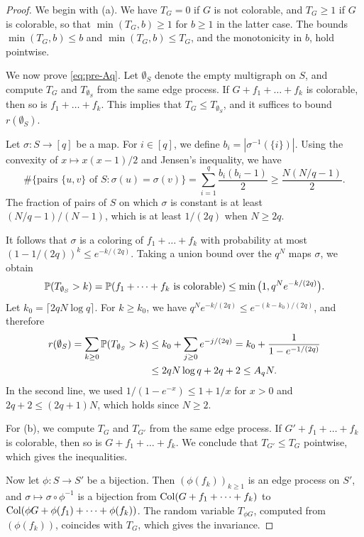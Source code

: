 \begin{proof}
We begin with (a). We have $T_G = 0$ if $G$ is not colorable, and $T_G \ge 1$ if $G$ is colorable, so that $\min(T_G, b) \ge 1$ for $b \ge 1$ in the latter case. The bounds $\min(T_G, b) \le b$ and $\min(T_G, b) \le T_G$, and the monotonicity in $b$, hold pointwise.

We now prove \eqref{eq:pre-Aq}. Let $\emptyset_S$ denote the empty multigraph on $S$, and compute $T_G$ and $T_{\emptyset_S}$ from the same edge process. If $G + f_1 + \dots + f_k$ is colorable, then so is $f_1 + \dots + f_k$. This implies that $T_G \le T_{\emptyset_S}$, and it suffices to bound $r(\emptyset_S)$.

Let $\sigma\colon S \to [q]$ be a map. For $i \in [q]$, we define $b_i = |\sigma^{-1}(\{i\})|$. Using the convexity of $x \mapsto x(x - 1)/2$ and Jensen's inequality, we have
\[
\#\{\text{pairs } \{u, v\} \text{ of } S : \sigma(u) = \sigma(v)\} = \sum_{i = 1}^q \frac{b_i (b_i - 1)}{2} \ge \frac{N (N/q - 1)}{2}.
\]
The fraction of pairs of $S$ on which $\sigma$ is constant is at least $(N/q - 1)/(N - 1)$, which is at least $1/(2q)$ when $N \ge 2q$.

It follows that $\sigma$ is a coloring of $f_1 + \dots + f_k$ with probability at most $(1 - 1/(2q))^k \le e^{-k/(2q)}$. Taking a union bound over the $q^N$ maps $\sigma$, we obtain
\[
\mathbb P(T_{\emptyset_S} > k) = \mathbb P(f_1 + \dots + f_k \text{ is colorable}) \le \min\big(1, q^N e^{-k/(2q)}\big).
\]
Let $k_0 = \lceil 2 q N \log q \rceil$. For $k \ge k_0$, we have $q^N e^{-k/(2q)} \le e^{-(k - k_0)/(2q)}$, and therefore
\[
\begin{aligned}
r(\emptyset_S) = \sum_{k \ge 0} \mathbb P(T_{\emptyset_S} > k) &\le k_0 + \sum_{j \ge 0} e^{-j/(2q)} = k_0 + \frac{1}{1 - e^{-1/(2q)}}\\
&\le 2 q N \log q + 2q + 2 \le A_q N.
\end{aligned}
\]
In the second line, we used $1/(1 - e^{-x}) \le 1 + 1/x$ for $x > 0$ and $2q + 2 \le (2q + 1) N$, which holds since $N \ge 2$.

For (b), we compute $T_G$ and $T_{G'}$ from the same edge process. If $G' + f_1 + \dots + f_k$ is colorable, then so is $G + f_1 + \dots + f_k$. We conclude that $T_{G'} \le T_G$ pointwise, which gives the inequalities.

Now let $\phi \colon S \to S'$ be a bijection. Then $(\phi(f_k))_{k \ge 1}$ is an edge process on $S'$, and $\sigma \mapsto \sigma \circ \phi^{-1}$ is a bijection from $\operatorname{Col}(G + f_1 + \dots + f_k)$ to $\operatorname{Col}(\phi G + \phi(f_1) + \dots + \phi(f_k))$. The random variable $T_{\phi G}$, computed from $(\phi(f_k))$, coincides with $T_G$, which gives the invariance.


\end{proof}

